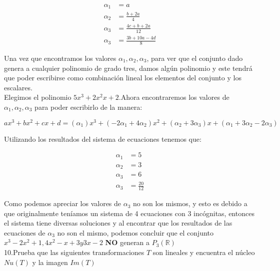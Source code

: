 \documentclass[letterpaper]{article}
\newcommand{\R}{\mathds{R}}
\renewcommand{\*}{\cdot}
\theoremstyle{definition}
\begin{document}
	\begin{center}
		\begin{align*}
		\alpha_{1}&=a\\
		\alpha_{2}&=\frac{b+2a}{4}\\
		\alpha_{3}&=\frac{4c+b+2a}{12}\\
		\alpha_{3}&=\frac{3b+10a-4d}{8}
		\end{align*}
	\end{center}

Una vez que encontramos los valores $\alpha_{1}, \alpha_{2}, \alpha_{3}$, para ver que el conjunto dado genera a cualquier polinomio de grado tres, damos algún polinomio y este tendrá que poder escribirse como combinación lineal los elementos del conjunto y los escalares.\\

Elegimos el polinomio $5x^3+2x^2x+2$.Ahora encontraremos los valores de $\alpha_{1}, \alpha_{2}, \alpha_{3}$ para poder escribirlo de la manera:
\begin{center}
	$ax^3+bx^2+cx+d = (\alpha_{1})x^3 + (-2\alpha_{1}+4\alpha_{2})x^2 + (\alpha_{2}+3\alpha_{3})x + (\alpha_{1}+3\alpha_{2}-2\alpha_{3})$
\end{center} 
Utilizando los resultados del sistema de ecuaciones tenemos que:

		\begin{align*}
		\alpha_{1}&=5\\
		\alpha_{2}&=3\\
		\alpha_{3}&=6\\
		\alpha_{3}&=\frac{20}{12}
		\end{align*}
		
Como podemos apreciar los valores de $\alpha_{3}$ no son los mismos, y esto es debido a que originalmente teníamos un sistema de 4 ecuaciones con 3 incógnitas, entonces el sistema tiene diversas soluciones y al encontrar que los resultados de las ecuaciones de $\alpha_{3}$ no son el mismo, podemos concluir que el conjunto $x^3-2x^2+1,4x^2-x+3 y 3x-2$  \textbf{NO} generan a $P_{3}(\R)$\\

\noindent 10.Prueba que las siguientes transformaciones $T$ son lineales y encuentra el núcleo $Nu(T)$ y la imagen $Im(T)$
\end{document}
